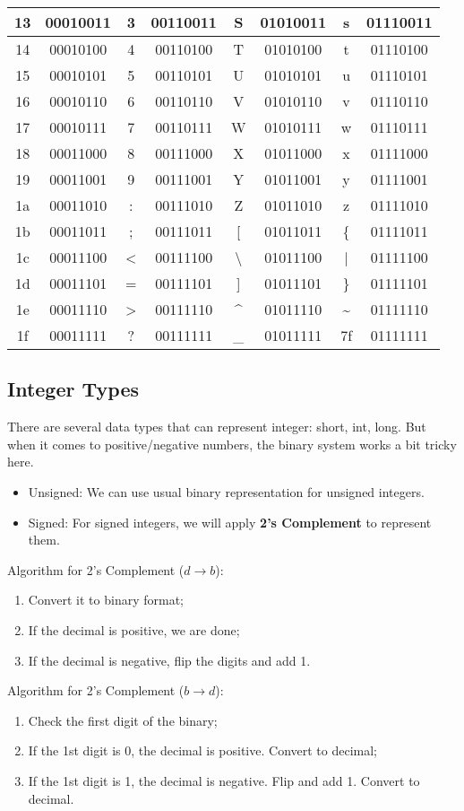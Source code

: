 \documentclass{article}
\begin{document}
\begin{center}
\begin{tabular}{|c|c|c|c|c|c|c|c|}
\hline
13 & 00010011 & 3 & 00110011 & S & 01010011 & s & 01110011 \\
\hline
14 & 00010100 & 4 & 00110100 & T & 01010100 & t & 01110100 \\
\hline
15 & 00010101 & 5 & 00110101 & U & 01010101 & u & 01110101 \\
\hline
16 & 00010110 & 6 & 00110110 & V & 01010110 & v & 01110110 \\
\hline
17 & 00010111 & 7 & 00110111 & W & 01010111 & w & 01110111 \\
\hline
18 & 00011000 & 8 & 00111000 & X & 01011000 & x & 01111000 \\
\hline
19 & 00011001 & 9 & 00111001 & Y & 01011001 & y & 01111001 \\
\hline
1a & 00011010 & : & 00111010 & Z & 01011010 & z & 01111010 \\
\hline
1b & 00011011 & ; & 00111011 & [ & 01011011 & \{ & 01111011 \\
\hline
1c & 00011100 & < & 00111100 & \textbackslash & 01011100 & | & 01111100 \\
\hline
1d & 00011101 & = & 00111101 & ] & 01011101 & \} & 01111101 \\
\hline
1e & 00011110 & > & 00111110 & \textasciicircum & 01011110 & \textasciitilde & 01111110 \\
\hline
1f & 00011111 & ? & 00111111 & \_ & 01011111 & 7f & 01111111 \\
\hline
\end{tabular}
\end{center}

\subsection{Integer Types}
There are several data types that can represent integer: short, int, long. But when it comes to positive/negative numbers, the binary system works a bit tricky here.
\begin{itemize}
    \item Unsigned: We can use usual binary representation for unsigned integers.
    \item Signed: For signed integers, we will apply \textbf{2's Complement} to represent them.
\end{itemize}
Algorithm for 2's Complement ($d \rightarrow b$):
\begin{enumerate}
    \item Convert it to binary format;
    \item If the decimal is positive, we are done;
    \item If the decimal is negative, flip the digits and add 1.
\end{enumerate}
Algorithm for 2's Complement ($b \rightarrow d$):
\begin{enumerate}
    \item Check the first digit of the binary;
    \item If the 1st digit is 0, the decimal is positive. Convert to decimal;
    \item If the 1st digit is 1, the decimal is negative. Flip and add 1. Convert to decimal.
\end{enumerate}
\end{document}
